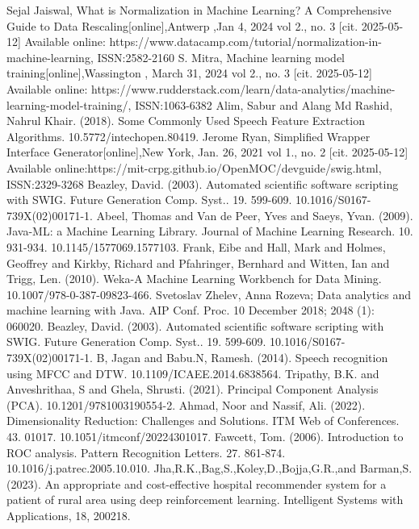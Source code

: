 \documentclass[english,12pt,oneside,a4paper]{article}
\begin{document}
\begin{thebibliography}{15}
		Sejal Jaiswal, What is Normalization in Machine Learning? A Comprehensive Guide to Data Rescaling[online],Antwerp ,Jan 4, 2024 vol 2., no. 3 [cit. 2025-05-12] 
		Available online: https://www.datacamp.com/tutorial/normalization-in-machine-learning, ISSN:2582-2160
		S. Mitra, Machine learning model training[online],Wassington , March 31, 2024 vol 2., no. 3 [cit. 2025-05-12]
		Available online: https://www.rudderstack.com/learn/data-analytics/machine-learning-model-training/, ISSN:1063-6382
		Alim, Sabur and Alang Md Rashid, Nahrul Khair. (2018). Some Commonly Used Speech Feature Extraction Algorithms. 10.5772/intechopen.80419. 
		Jerome Ryan, Simplified Wrapper Interface Generator[online],New York, Jan. 26, 2021 vol 1., no. 2 [cit. 2025-05-12]
		Available online:https://mit-crpg.github.io/OpenMOC/devguide/swig.html, ISSN:2329-3268
		Beazley, David. (2003). Automated scientific software scripting with SWIG. Future Generation Comp. Syst.. 19. 599-609. 10.1016/S0167-739X(02)00171-1. 
		Abeel, Thomas and Van de Peer, Yves and Saeys, Yvan. (2009). Java-ML: a Machine Learning Library. Journal of Machine Learning Research. 10. 931-934. 10.1145/1577069.1577103. 
		Frank, Eibe and Hall, Mark and Holmes, Geoffrey and Kirkby, Richard and Pfahringer, Bernhard and Witten, Ian and Trigg, Len. (2010). Weka-A Machine Learning Workbench for Data Mining. 10.1007/978-0-387-09823-466. 
		Svetoslav Zhelev, Anna Rozeva; Data analytics and machine learning with Java. AIP Conf. Proc. 10 December 2018; 2048 (1): 060020.
		Beazley, David. (2003). Automated scientific software scripting with SWIG. Future Generation Comp. Syst.. 19. 599-609. 10.1016/S0167-739X(02)00171-1. 
		B, Jagan and Babu.N, Ramesh. (2014). Speech recognition using MFCC and DTW. 10.1109/ICAEE.2014.6838564.
		Tripathy, B.K. and Anveshrithaa, S and Ghela, Shrusti. (2021). Principal Component Analysis (PCA). 10.1201/9781003190554-2. 
		Ahmad, Noor and Nassif, Ali. (2022). Dimensionality Reduction: Challenges and Solutions. ITM Web of Conferences. 43. 01017. 10.1051/itmconf/20224301017. 
		Fawcett, Tom. (2006). Introduction to ROC analysis. Pattern Recognition Letters. 27. 861-874. 10.1016/j.patrec.2005.10.010. 
		Jha,R.K.,Bag,S.,Koley,D.,Bojja,G.R.,and Barman,S. (2023). An appropriate and cost-effective hospital recommender system for a patient of rural area using deep reinforcement learning. Intelligent Systems with Applications, 18, 200218.

\end{thebibliography}
\end{document}
